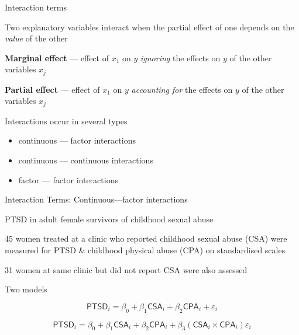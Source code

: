 \documentclass[10pt,ignorenonframetext,compress, aspectratio=169]{beamer}
\providecommand{\tightlist}{%
  \setlength{\itemsep}{0pt}\setlength{\parskip}{0pt}}
\begin{document}
\begin{frame}{Interaction terms}

Two explanatory variables \alert{interact} when the \alert{partial}
effect of one depends on the \emph{value} of the other

\textbf{\alert{Marginal effect}} --- effect of \(x_1\) on \(y\)
\emph{ignoring} the effects on \(y\) of the other variables \(x_j\)

\textbf{\alert{Partial effect}} --- effect of \(x_1\) on \(y\)
\emph{accounting for} the effects on \(y\) of the other variables
\(x_j\)

Interactions occur in several types

\begin{itemize}
\tightlist
\item
  continuous --- factor interactions
\item
  continuous --- continuous interactions
\item
  factor --- factor interactions
\end{itemize}

\end{frame}

\begin{frame}{Interaction Terms: Continuous---factor interactions}

\begin{block}{PTSD in adult female survivors of childhood sexual abuse}

45 women treated at a clinic who reported childhood sexual abuse (CSA)
were measured for PTSD \& childhood physical abuse (CPA) on standardised
scales

31 women at same clinic but did not report CSA were also assessed

Two models

\begin{equation}
\mathsf{PTSD}_i = \beta_0 + \beta_1 \mathsf{CSA}_i + \beta_2 \mathsf{CPA}_i + \varepsilon_i
\end{equation}

\begin{equation}
\mathsf{PTSD}_i = \beta_0 + \beta_1 \mathsf{CSA}_i + \beta_2 \mathsf{CPA}_i + \beta_3 (\mathsf{CSA}_i \times \mathsf{CPA}_i) \varepsilon_i
\end{equation}

\end{block}

\end{frame}
\end{document}
